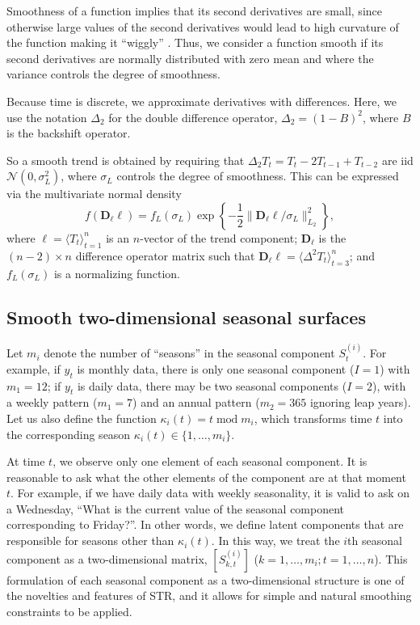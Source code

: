 \documentclass[ijds,nonblindrev]{informs-ijds}
\begin{document}
Smoothness of a function implies that its second derivatives are small, since otherwise large values of the second derivatives would lead to high curvature of the function making it ``wiggly'' \citep[see][]{Wood}. Thus, we consider a function smooth if its second derivatives are normally distributed with zero mean and where the variance controls the degree of smoothness.

Because time is discrete, we approximate derivatives with differences. Here, we use the notation \(\Delta_2\) for the double difference operator, \(\Delta_2 = (1-B)^2\), where \(B\) is the backshift operator.

So a smooth trend is obtained by requiring that \(\Delta_2 T_t = T_{t}-2T_{t-1}+T_{t-2}\) are iid \(\mathcal{N}(0,\sigma_L^2)\), where \(\sigma_L\) controls the degree of smoothness. This can be expressed via the multivariate normal density
\[
  f(\bm{D}_\ell \bm{\ell}) = f_L(\sigma_L) \exp\left\{-\frac{1}{2}\big\|\bm{D}_\ell \bm{\ell} / \sigma_L\big\|_{L_2}^2\right\},
\]
where
\(\bm{\ell} = \langle T_{t} \rangle_{t=1}^{n}\) is an \(n\)-vector of the trend component;
\(\bm{D}_\ell\) is the \((n-2) \times n\) difference operator matrix such that \(\bm{D}_\ell\bm{\ell} = \langle\Delta^2 T_{t}\rangle_{t=3}^n\);
and \(f_L(\sigma_L)\) is a normalizing function.

\hypertarget{smooth-two-dimensional-seasonal-surfaces}{%
\subsection{Smooth two-dimensional seasonal surfaces}\label{smooth-two-dimensional-seasonal-surfaces}}

Let \(m_i\) denote the number of ``seasons'' in the seasonal component \(S^{(i)}_{t}\). For example, if \(y_t\) is monthly data, there is only one seasonal component (\(I=1\)) with \(m_1 = 12\); if \(y_t\) is daily data, there may be two seasonal components (\(I=2\)), with a weekly pattern (\(m_1=7\)) and an annual pattern (\(m_2 = 365\) ignoring leap years). Let us also define the function \(\kappa_i(t) = t\operatorname{mod}m_i\), which transforms time \(t\) into the corresponding season \(\kappa_i(t) \in \{1,\dots,m_i\}\).

At time \(t\), we observe only one element of each seasonal component. It is reasonable to ask what the other elements of the component are at that moment \(t\). For example, if we have daily data with weekly seasonality, it is valid to ask on a Wednesday, ``What is the current value of the seasonal component corresponding to Friday?''. In other words, we define latent components that are responsible for seasons other than \(\kappa_i(t)\). In this way, we treat the \(i\)th seasonal component as a two-dimensional matrix, \([S^{(i)}_{k,t}]\) (\(k=1,\dots,m_i;t=1,\dots,n\)). This formulation of each seasonal component as a two-dimensional structure is one of the novelties and features of STR, and it allows for simple and natural smoothing constraints to be applied.
\end{document}
